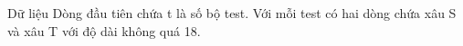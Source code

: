 Dữ liệu
Dòng đầu tiên chứa t là số bộ test. Với mỗi test có hai dòng chứa xâu S và xâu T với độ dài không quá 18.